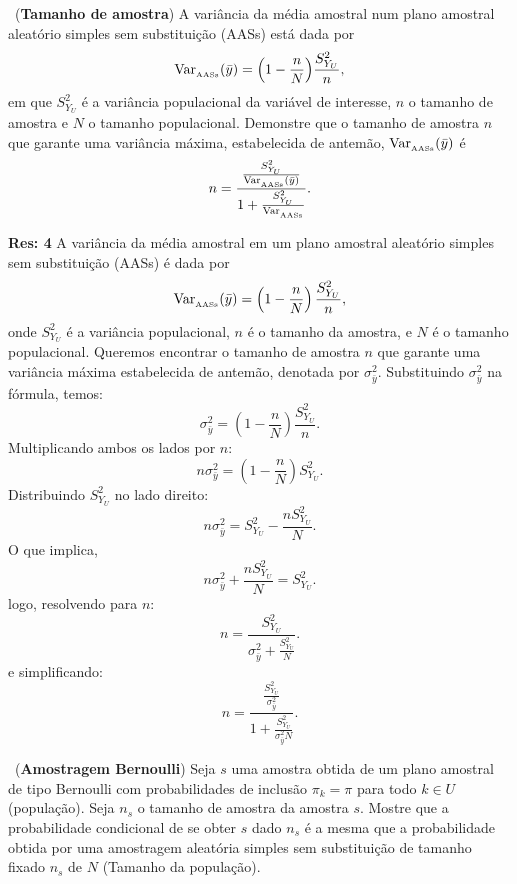 \documentclass[a4paper,12pt,oneside,twocolumn]{Config/milktest}
\begin{document}
\medskip

\question~({\bf Tamanho de amostra}) 
A variância da média amostral num plano amostral aleatório simples sem substituição (AASs) está dada por
$$
{\rm Var}_{_{\rm AASs}}(\bar{y}) = \Big( 1-\frac{n}{N}\Big)\frac{S^2_{Y_U}}{n},
$$
em que $S^2_{Y_U}$ é a variância populacional da variável de interesse, $n$ o tamanho de amostra e $N$ o tamanho populacional. Demonstre que o tamanho de amostra $n$ que garante uma variância máxima, estabelecida de antemão, ${\rm Var}_{_{\rm AASs}}(\bar{y})$ é
$$
n = \frac{
            \frac{S^2_{Y_U}}{{\rm Var}_{_{\rm AASs}}(\bar{y})}}{1+\frac{S^2_{Y_U}}{{\rm Var}_{_{\rm AASs}}}}.
$$

\medskip
{\scriptsize  {\bf Res: 4}
A variância da média amostral em um plano amostral aleatório simples sem substituição (AASs) é dada por
\[
{\rm Var}_{_{\rm AASs}}(\bar{y}) = \left( 1 - \frac{n}{N} \right) \frac{S^2_{Y_U}}{n},
\]
onde \( S^2_{Y_U} \) é a variância populacional, \( n \) é o tamanho da amostra, e \( N \) é o tamanho populacional. Queremos encontrar o tamanho de amostra \( n \) que garante uma variância máxima estabelecida de antemão, denotada por \( \sigma^2_{\bar{y}} \). Substituindo \( \sigma^2_{\bar{y}} \) na fórmula, temos:
\[
\sigma^2_{\bar{y}} = \left( 1 - \frac{n}{N} \right) \frac{S^2_{Y_U}}{n}.
\] Multiplicando ambos os lados por \( n \):
\[
n \sigma^2_{\bar{y}} = \left( 1 - \frac{n}{N} \right) S^2_{Y_U}.
\] Distribuindo \( S^2_{Y_U} \) no lado direito:
\[
n \sigma^2_{\bar{y}} = S^2_{Y_U} - \frac{n S^2_{Y_U}}{N}.
\] O que implica,  \[
n \sigma^2_{\bar{y}} + \frac{n S^2_{Y_U}}{N} = S^2_{Y_U}.
\] logo,  resolvendo para \( n \):
\[
n = \frac{S^2_{Y_U}}{\sigma^2_{\bar{y}} + \frac{S^2_{Y_U}}{N}}.
\] e  simplificando:
\[
n = \frac{\frac{S^2_{Y_U}}{\sigma^2_{\bar{y}}}}{1 + \frac{S^2_{Y_U}}{\sigma^2_{\bar{y}} N}}.
\]
}

\medskip 
\question~({\bf Amostragem Bernoulli}) Seja $s$ uma amostra obtida de um plano amostral de tipo Bernoulli com probabilidades de inclusão $\pi_k = \pi$ para todo $k \in U$ (população). Seja $n_s$ o tamanho de amostra da amostra $s.$ Mostre que a probabilidade condicional de se obter $s$ dado $n_s$ é a mesma que a probabilidade obtida por uma amostragem aleatória simples sem substituição de tamanho fixado $n_s$ de $N$ (Tamanho da população). 
\end{document}
